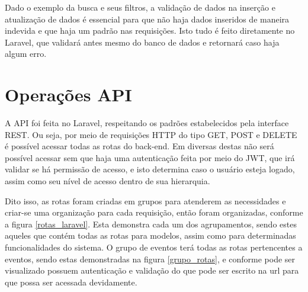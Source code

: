 
Dado o exemplo da busca e seus filtros, a validação de dados na inserção e atualização de dados é essencial para que não haja dados inseridos de maneira indevida e que haja um padrão nas requisições. Isto tudo é feito diretamente no Laravel, que validará antes mesmo do banco de dados e retornará caso haja algum erro.
\section{Operações API}
A API foi feita no Laravel, respeitando os padrões estabelecidos pela interface REST. Ou seja, por meio de requisições HTTP do tipo GET, POST e DELETE é possível acessar todas as rotas do back-end. Em diversas destas não será possível acessar sem que haja uma autenticação feita por meio do JWT, que irá validar se há permissão de acesso, e isto determina caso o usuário esteja logado, assim como seu nível de acesso dentro de sua hierarquia. 

Dito isso, as rotas foram criadas em grupos para atenderem as necessidades e criar-se uma organização para cada requisição, então foram organizadas, conforme a figura \ref{rotas_laravel}. Esta demonstra cada um dos agrupamentos, sendo estes aqueles que contém todas as rotas para modelos, assim como para determinadas funcionalidades do sistema. O grupo de eventos terá todas as rotas pertencentes a eventos, sendo estas demonstradas na figura \ref{grupo_rotas}, e conforme pode ser visualizado possuem autenticação e validação do que pode ser escrito na url para que possa ser acessada devidamente. 

